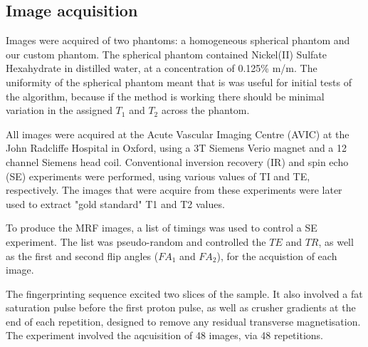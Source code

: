 \documentclass[journal]{IEEEtran}
\begin{document}
\subsection{Image acquisition}

 Images were acquired of two phantoms: a homogeneous spherical phantom and our custom phantom. 
The spherical phantom contained Nickel(II) Sulfate Hexahydrate in distilled water, at a concentration of 0.125\% m/m. The uniformity of the spherical phantom meant that is was useful for initial tests of the algorithm, because if the method is working there should be minimal variation in the assigned $T_1$ and $T_2$ across the phantom.

All images were acquired at the Acute Vascular Imaging Centre (AVIC) at the John Radcliffe Hospital in Oxford, using a 3T Siemens Verio magnet and a 12 channel Siemens head coil. 
Conventional inversion recovery (IR) and spin echo (SE) experiments were performed, using various values of TI and TE, respectively. The images that were acquire from these experiments were later used to extract "gold standard" T1 and T2 values. 

To produce the MRF images, a list of timings was used to control a SE experiment. The list was pseudo-random and controlled the $TE$ and $TR$, as well as the first and second flip angles ($FA_1$ and $FA_2$), for the acquistion of each image.

 The fingerprinting sequence excited two slices of the sample. It also involved a fat saturation pulse before the first proton pulse, as well as crusher gradients at the end of each repetition, designed to remove any residual transverse magnetisation.  The experiment involved the aqcuisition of 48 images, via 48 repetitions. 
\end{document}
